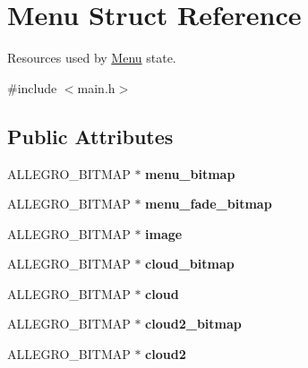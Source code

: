 \hypertarget{structMenu}{\section{\-Menu \-Struct \-Reference}
\label{structMenu}
}


\-Resources used by \hyperlink{structMenu}{\-Menu} state.  




{\ttfamily \#include $<$main.\-h$>$}

\subsection*{\-Public \-Attributes}
\begin{DoxyCompactItemize}
\item 
\hypertarget{structMenu_a0d7b80f34ea24f9c426c75a776dcac8c}{\-A\-L\-L\-E\-G\-R\-O\-\_\-\-B\-I\-T\-M\-A\-P $\ast$ {\bfseries menu\-\_\-bitmap}}\label{structMenu_a0d7b80f34ea24f9c426c75a776dcac8c}

\item 
\hypertarget{structMenu_a4e989581dad92db00aa46cc0a7a6b512}{\-A\-L\-L\-E\-G\-R\-O\-\_\-\-B\-I\-T\-M\-A\-P $\ast$ {\bfseries menu\-\_\-fade\-\_\-bitmap}}\label{structMenu_a4e989581dad92db00aa46cc0a7a6b512}

\item 
\hypertarget{structMenu_a57198bccf9b605ef34ab75c55ee03297}{\-A\-L\-L\-E\-G\-R\-O\-\_\-\-B\-I\-T\-M\-A\-P $\ast$ {\bfseries image}}\label{structMenu_a57198bccf9b605ef34ab75c55ee03297}

\item 
\hypertarget{structMenu_a3423dfa7d8ac4f17d9a78fb78db9e405}{\-A\-L\-L\-E\-G\-R\-O\-\_\-\-B\-I\-T\-M\-A\-P $\ast$ {\bfseries cloud\-\_\-bitmap}}\label{structMenu_a3423dfa7d8ac4f17d9a78fb78db9e405}

\item 
\hypertarget{structMenu_ad9a9314f130c7ede42bde331d90fc9b5}{\-A\-L\-L\-E\-G\-R\-O\-\_\-\-B\-I\-T\-M\-A\-P $\ast$ {\bfseries cloud}}\label{structMenu_ad9a9314f130c7ede42bde331d90fc9b5}

\item 
\hypertarget{structMenu_ae432720128907e864f914e885f83a1cc}{\-A\-L\-L\-E\-G\-R\-O\-\_\-\-B\-I\-T\-M\-A\-P $\ast$ {\bfseries cloud2\-\_\-bitmap}}\label{structMenu_ae432720128907e864f914e885f83a1cc}

\item 
\hypertarget{structMenu_ade235ed3f0eaed2cf6fb9c48895dc6bd}{\-A\-L\-L\-E\-G\-R\-O\-\_\-\-B\-I\-T\-M\-A\-P $\ast$ {\bfseries cloud2}}\label{structMenu_ade235ed3f0eaed2cf6fb9c48895dc6bd}


\end{DoxyCompactItemize}
